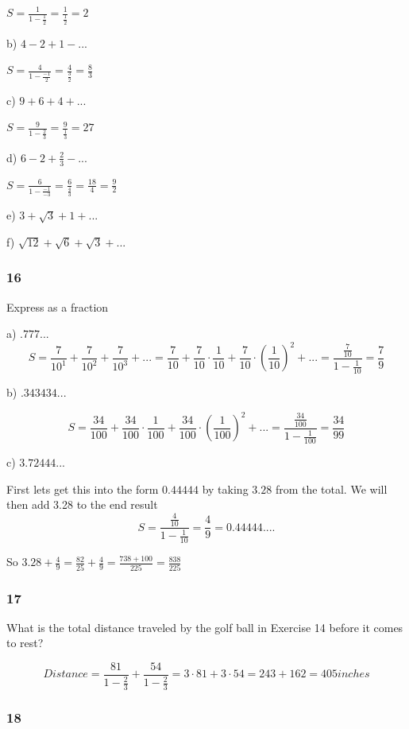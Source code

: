 \documentclass[]{report}
\begin{document}
$ S = \frac{1}{1-\frac{1}{2}} = \frac{1}{\frac{1}{2}} = 2$

b) $ 4 - 2 + 1 - ...$

$S = \frac{4}{1-\frac{-1}{2}} = \frac{4}{\frac{3}{2}} = \frac{8}{3}$

c) $9 + 6 + 4 + ...$

$ S = \frac{9}{1 - \frac{2}{3}} = \frac{9}{\frac{1}{3}} = 27$

d) $6 - 2 + \frac{2}{3} - ... $

$S = \frac{6}{1 - \frac{-1}{-3}} = \frac{6}{\frac{4}{3}} = \frac{18}{4} = \frac{9}{2}$

e) $3 + \sqrt{3} + 1 + ... $

f) $\sqrt{12} + \sqrt{6} + \sqrt{3} + ... $

\subsubsection{16}

Express as a fraction

a) $.777...$
\[
S = \frac{7}{10^1} + \frac{7}{10^2} + \frac{7}{10^3} + ... = \frac{7}{10} + \frac{7}{10}\cdot\frac{1}{10} + \frac{7}{10}\cdot(\frac{1}{10})^2 + ... = \frac{\frac{7}{10}}{1 - \frac{1}{10}}  = \frac{7}{9}
\]

b) $.343434...$

\[
S = \frac{34}{100} + \frac{34}{100} \cdot \frac{1}{100} + \frac{34}{100} \cdot (\frac{1}{100})^2 + ... = \frac{\frac{34}{100}}{1-\frac{1}{100}} = \frac{34}{99}
\]

c) $3.72444...$

First lets get this into the form $0.44444$ by taking $3.28$ from the total. We will then add 3.28 to the end result
\[
S = \frac{\frac{4}{10}}{1- \frac{1}{10}} = \frac{4}{9} = 0.44444....
\]

So $3.28 + \frac{4}{9} = \frac{82}{25} + \frac{4}{9} = \frac{738+ 100}{225} = \frac{838}{225}$
\subsubsection{17}

What is the total distance traveled by the golf ball in Exercise 14 before it comes to rest?

\[
Distance = \frac{81}{1-\frac{2}{3}} + \frac{54}{1 - \frac{2}{3}} = 3 \cdot 81 + 3 \cdot 54 = 243 + 162 = 405 inches
\]

\subsubsection{18}
\end{document}
